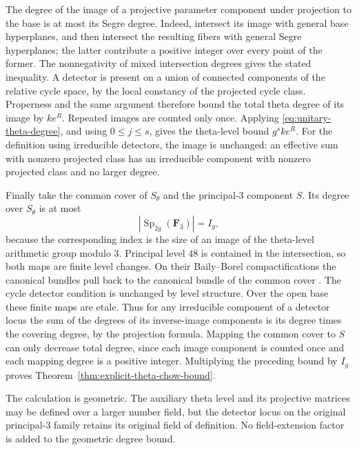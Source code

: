 \documentclass[11pt]{article}
\theoremstyle{definition}
\theoremstyle{remark}
\begin{document}
The degree of the image of a projective parameter component
under projection to the base is at most its Segre degree.
Indeed, intersect its image with general base hyperplanes,
and then intersect the resulting fibers with general Segre
hyperplanes; the latter contribute a positive integer over
every point of the former.  The nonnegativity of mixed
intersection degrees gives the stated inequality.  A
detector is present on a union of connected components of
the relative cycle space, by the local constancy of the
projected cycle class.  Properness and the same argument
therefore bound the total theta degree of its image by
$k e^R$.  Repeated images are counted only once.  Applying
\eqref{eq:unitary-theta-degree}, and using $0\leq j\leq s$,
gives the theta-level bound $g^s k e^R$.  For the definition
using irreducible detectors, the image is unchanged: an
effective sum with nonzero projected class has an
irreducible component with nonzero projected class and no
larger degree.

Finally take the common cover of $S_\theta$ and the
principal-$3$ component $S$.  Its degree over $S_\theta$
is at most
\[
 |\operatorname{Sp}_{2g}(\mathbf F_3)|=I_g,
\]
because the corresponding index is the size of an image of
the theta-level arithmetic group modulo $3$.  Principal
level $48$ is contained in the intersection, so both maps
are finite level changes.  On their Baily--Borel
compactifications the canonical bundles pull back to the
canonical bundle of the common cover
\cite[\S3.2]{DawJavanpeykarKuhne2020}.  The cycle detector
condition is unchanged by level structure.  Over the open
base these finite maps are etale.  Thus for any irreducible
component of a detector locus the sum of the degrees of
its inverse-image components is its degree times the
covering degree, by the projection formula.  Mapping the
common cover to $S$ can only decrease total degree, since
each image component is counted once and each mapping
degree is a positive integer.  Multiplying the preceding
bound by $I_g$ proves
Theorem~\ref{thm:explicit-theta-chow-bound}.

The calculation is geometric.  The auxiliary theta level
and its projective matrices may be defined over a larger
number field, but the detector locus on the original
principal-$3$ family retains its original field of
definition.  No field-extension factor is added to the
geometric degree bound.
\end{document}

